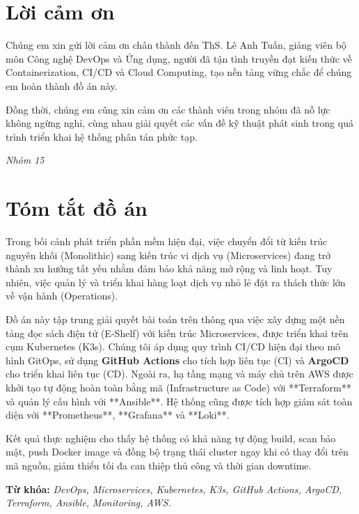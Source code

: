 \documentclass[12pt, a4paper]{article}
\begin{document}
\section*{Lời cảm ơn}
Chúng em xin gửi lời cảm ơn chân thành đến ThS. Lê Anh Tuấn, giảng viên bộ môn Công nghệ DevOps và Ứng dụng, người đã tận tình truyền đạt kiến thức về Containerization, CI/CD và Cloud Computing, tạo nền tảng vững chắc để chúng em hoàn thành đồ án này.

Đồng thời, chúng em cũng xin cảm ơn các thành viên trong nhóm đã nỗ lực không ngừng nghỉ, cùng nhau giải quyết các vấn đề kỹ thuật phát sinh trong quá trình triển khai hệ thống phân tán phức tạp.

\vspace{1cm}
\begin{flushright}
    \textit{Nhóm 15}
\end{flushright}
\pagebreak

\section*{Tóm tắt đồ án}
Trong bối cảnh phát triển phần mềm hiện đại, việc chuyển đổi từ kiến trúc nguyên khối (Monolithic) sang kiến trúc vi dịch vụ (Microservices) đang trở thành xu hướng tất yếu nhằm đảm bảo khả năng mở rộng và linh hoạt. Tuy nhiên, việc quản lý và triển khai hàng loạt dịch vụ nhỏ lẻ đặt ra thách thức lớn về vận hành (Operations).

Đồ án này tập trung giải quyết bài toán trên thông qua việc xây dựng một nền tảng đọc sách điện tử (E-Shelf) với kiến trúc Microservices, được triển khai trên cụm Kubernetes (K3s). Chúng tôi áp dụng quy trình CI/CD hiện đại theo mô hình GitOps, sử dụng \textbf{GitHub Actions} cho tích hợp liên tục (CI) và \textbf{ArgoCD} cho triển khai liên tục (CD). Ngoài ra, hạ tầng mạng và máy chủ trên AWS được khởi tạo tự động hoàn toàn bằng mã (Infrastructure as Code) với **Terraform** và quản lý cấu hình với **Ansible**. Hệ thống cũng được tích hợp giám sát toàn diện với **Prometheus**, **Grafana** và **Loki**.

Kết quả thực nghiệm cho thấy hệ thống có khả năng tự động build, scan bảo mật, push Docker image và đồng bộ trạng thái cluster ngay khi có thay đổi trên mã nguồn, giảm thiểu tối đa can thiệp thủ công và thời gian downtime.

\textbf{Từ khóa:} \textit{DevOps, Microservices, Kubernetes, K3s, GitHub Actions, ArgoCD, Terraform, Ansible, Monitoring, AWS.}
\pagebreak
\end{document}
